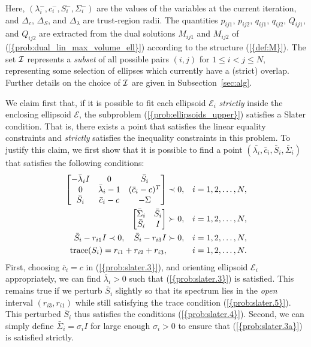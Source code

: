 \documentclass{siamltex}
\begin{document}
Here, $(\lambda_i^-,c_i^-,S_i^-,\Sigma_i^-)$ are the values of the
variables at the current iteration, and $\Delta_c$, $\Delta_S$, and
$\Delta_{\lambda}$ are trust-region radii. The quantities $p_{ij1}$,
$p_{ij2}$, $q_{ij1}$, $q_{ij2}$, $Q_{ij1}$, and $Q_{ij2}$ are
extracted from the dual solutions $M_{ij1}$ and $M_{ij2}$ of
{(\ref{{prob:dual_lin_max_volume_ell}})} according to the structure
{(\ref{{def:M}})}.  The set ${\cal I}$ represents a {\em subset} of all
possible pairs $(i,j)$ for $1 \le i < j \le N$, representing some
selection of ellipses which currently have a (strict) overlap. Further
details on the choice of ${\cal I}$ are given in
Subsection~\ref{sec:alg}.

We claim first that, if it is possible to fit each ellipsoid
$\mathcal{E}_i$ {\em strictly} inside the enclosing ellipsoid
$\mathcal{E}$, the subproblem {(\ref{{prob:ellipsoids_upper}})} satisfies a
Slater condition. That is, there exists a point that satisfies the
linear equality constraints and {\em strictly} satisfies the
inequality constraints in this problem. To justify this claim, we
first show that it is possible to find a point
$(\bar{\lambda_i},\bar{c}_i, \bar{S}_i, \bar{\Sigma}_i)$ that
satisfies the following conditions:
\begin{subequations}
\label{prob:slater}
\begin{align}
\label{prob:slater.3}
\left[ \begin{matrix} - \bar{\lambda}_i I &0&\bar{S}_i\\
0& \bar{\lambda}_i-1&(\bar{c}_i-c)^T\\ 
\bar{S}_i &\bar{c}_i-c&-\Sigma \end{matrix} \right] &\prec 0, && i=1,2,\dotsc,N, \\
\label{prob:slater.3a}
\left[ \begin{matrix} \bar{\Sigma}_i & \bar{S}_i \\ \bar{S}_i & I \end{matrix} \right] &\succ 0,  && i=1,2,\dotsc,N, \\
\label{prob:slater.4}
\bar{S}_i-r_{i1} I \prec 0, \quad \bar{S}_i-r_{i3} I&\succ 0, && i=1,2,\dots,N,\\
\label{prob:slater.5}
{\mbox{\rm trace}}(S_i)=r_{i1}+r_{i2}+r_{i3},& &&  i=1,2,\dots,N.
\end{align}
\end{subequations}
First, choosing $\bar{c}_i=c$ in {(\ref{{prob:slater.3}})}, and orienting
ellipsoid $\mathcal{E}_i$ appropriately, we can find
$\bar{\lambda}_i>0$ such that {(\ref{{prob:slater.3}})} is satisfied. This
remains true if we perturb $\bar{S}_i$ slightly so that its spectrum
lies in the {\em open} interval $(r_{i3},r_{i1})$ while still
satisfying the trace condition {(\ref{{prob:slater.5}})}. This perturbed
$\bar{S}_i$ thus satisfies the conditions
{(\ref{{prob:slater.4}})}. Second, we can simply define
$\bar{\Sigma}_i = \sigma_i I$ for large enough $\sigma_i>0$ to ensure
that {(\ref{{prob:slater.3a}})} is satisfied strictly.
\end{document}
